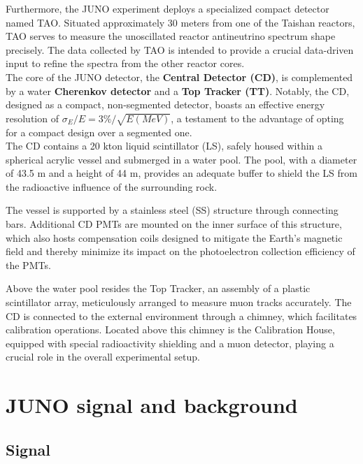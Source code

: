 Furthermore, the JUNO experiment deploys a specialized compact detector named TAO. Situated approximately 30 meters from one of the Taishan reactors, TAO serves to measure the unoscillated reactor antineutrino spectrum shape precisely. The data collected by TAO is intended to provide a crucial data-driven input to refine the spectra from the other reactor cores. \\
The core of the JUNO detector, the \textbf{Central Detector (CD)}, is complemented by a water \textbf{Cherenkov detector} and a \textbf{Top Tracker (TT)}. Notably, the CD, designed as a compact, non-segmented detector, boasts an effective energy resolution of $\sigma_E/E =3\% / \sqrt{E (MeV)}$, a testament to the advantage of opting for a compact design over a segmented one.\\

The CD contains a 20 kton liquid scintillator (LS), safely housed within a spherical acrylic vessel and submerged in a water pool. The pool, with a diameter of 43.5 m and a height of 44 m, provides an adequate buffer to shield the LS from the radioactive influence of the surrounding rock.

The vessel is supported by a stainless steel (SS) structure through connecting bars. Additional CD PMTs are mounted on the inner surface of this structure, which also hosts compensation coils designed to mitigate the Earth's magnetic field and thereby minimize its impact on the photoelectron collection efficiency of the PMTs.

Above the water pool resides the Top Tracker, an assembly of a plastic scintillator array, meticulously arranged to measure muon tracks accurately. The CD is connected to the external environment through a chimney, which facilitates calibration operations. Located above this chimney is the Calibration House, equipped with special radioactivity shielding and a muon detector, playing a crucial role in the overall experimental setup.

\newpage

\section{JUNO signal and background}

\subsection{Signal}

